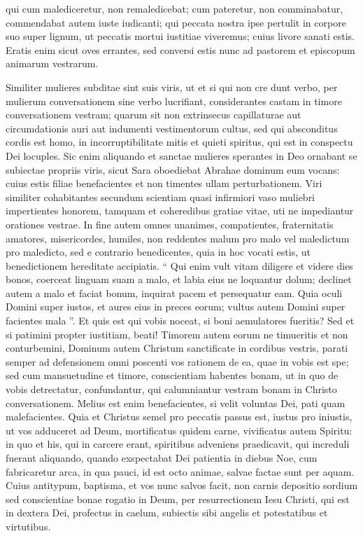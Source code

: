\begin{biblechapter}
\begin{biblechapter}
 \verse qui cum malediceretur, non remaledicebat;
 cum pateretur, non comminabatur, commendabat autem iuste iudicanti;
 \verse qui peccata nostra ipse pertulit
 in corpore suo super lignum,
 ut peccatis mortui iustitiae viveremus;
 cuius livore sanati estis.
 \verse Eratis enim sicut oves errantes,
 sed conversi estis nunc ad pastorem et episcopum animarum vestrarum.
  
\begin{biblechapter}
\verse Similiter mulieres subditae sint suis viris, ut et si qui non cre dunt verbo, per mulierum conversationem sine verbo lucrifiant, 
\verse considerantes castam in timore conversationem vestram; 
\verse quarum sit non extrinsecus capillaturae aut circumdationis auri aut indumenti vestimentorum cultus, 
\verse sed qui absconditus cordis est homo, in incorruptibilitate mitis et quieti spiritus, qui est in conspectu Dei locuples. 
\verse Sic enim aliquando et sanctae mulieres sperantes in Deo ornabant se subiectae propriis viris, 
\verse sicut Sara oboediebat Abrahae dominum eum vocans: cuius estis filiae benefacientes et non timentes ullam perturbationem.
 \verse Viri similiter cohabitantes secundum scientiam quasi infirmiori vaso muliebri impertientes honorem, tamquam et coheredibus gratiae vitae, uti ne impediantur orationes vestrae. 
\verse In fine autem omnes unanimes, compatientes, fraternitatis amatores, misericordes, humiles, 
\verse non reddentes malum pro malo vel maledictum pro maledicto, sed e contrario benedicentes, quia in hoc vocati estis, ut benedictionem hereditate accipiatis.
 \verse “ Qui enim vult vitam diligere
 et videre dies bonos,
 coerceat linguam suam a malo,
 \verse et labia eius ne loquantur dolum;
 declinet autem a malo et faciat bonum,
 inquirat pacem et persequatur eam.
 \verse Quia oculi Domini super iustos,
 et aures eius in preces eorum;
 vultus autem Domini super facientes mala ”.
 \verse Et quis est qui vobis noceat, si boni aemulatores fueritis? 
\verse Sed et si patimini propter iustitiam, beati! Timorem autem eorum ne timueritis et non conturbemini, 
\verse Dominum autem Christum sanctificate in cordibus vestris, parati semper ad defensionem omni poscenti vos rationem de ea, quae in vobis est spe; 
\verse sed cum mansuetudine et timore, conscientiam habentes bonam, ut in quo de vobis detrectatur, confundantur, qui calumniantur vestram bonam in Christo conversationem. 
\verse Melius est enim benefacientes, si velit voluntas Dei, pati quam malefacientes. 
\verse Quia et Christus semel pro peccatis passus est, iustus pro iniustis, ut vos adduceret ad Deum, mortificatus quidem carne, vivificatus autem Spiritu: 
\verse in quo et his, qui in carcere erant, spiritibus adveniens praedicavit, 
\verse qui increduli fuerant aliquando, quando exspectabat Dei patientia in diebus Noe, cum fabricaretur arca, in qua pauci, id est octo animae, salvae factae sunt per aquam. 
\verse Cuius antitypum, baptisma, et vos nunc salvos facit, non carnis depositio sordium sed conscientiae bonae rogatio in Deum, per resurrectionem Iesu Christi, 
\verse qui est in dextera Dei, profectus in caelum, subiectis sibi angelis et potestatibus et virtutibus.
 

\end{biblechapter}
\end{biblechapter}
\end{biblechapter}
